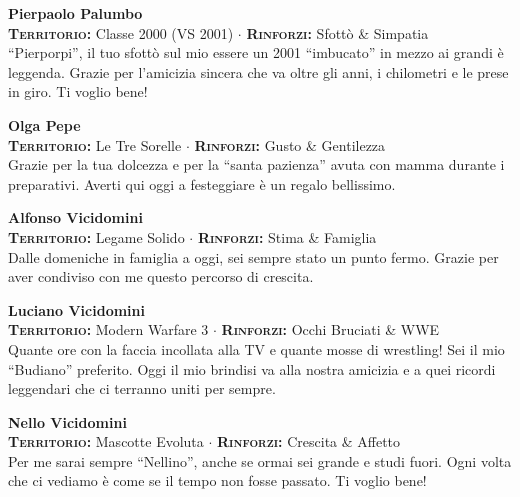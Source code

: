 \noindent\begin{minipage}{\linewidth}
\textbf{Pierpaolo Palumbo} \\
{\footnotesize \textbf{\textsc{Territorio:}} Classe 2000 (VS 2001) $\cdot$ \textbf{\textsc{Rinforzi:}} Sfottò \& Simpatia} \\
``Pierporpi'', il tuo sfottò sul mio essere un 2001 ``imbucato'' in mezzo ai grandi è leggenda. Grazie per l'amicizia sincera che va oltre gli anni, i chilometri e le prese in giro. Ti voglio bene!
\end{minipage}
\vspace{0.6cm}

\noindent\begin{minipage}{\linewidth}
\textbf{Olga Pepe} \\
{\footnotesize \textbf{\textsc{Territorio:}} Le Tre Sorelle $\cdot$ \textbf{\textsc{Rinforzi:}} Gusto \& Gentilezza} \\
Grazie per la tua dolcezza e per la ``santa pazienza'' avuta con mamma durante i preparativi. Averti qui oggi a festeggiare è un regalo bellissimo.
\end{minipage}
\vspace{0.6cm}

\noindent\begin{minipage}{\linewidth}
\textbf{Alfonso Vicidomini} \\
{\footnotesize \textbf{\textsc{Territorio:}} Legame Solido $\cdot$ \textbf{\textsc{Rinforzi:}} Stima \& Famiglia} \\
Dalle domeniche in famiglia a oggi, sei sempre stato un punto fermo. Grazie per aver condiviso con me questo percorso di crescita.
\end{minipage}
\vspace{0.6cm}

\noindent\begin{minipage}{\linewidth}
\textbf{Luciano Vicidomini} \\
{\footnotesize \textbf{\textsc{Territorio:}} Modern Warfare 3 $\cdot$ \textbf{\textsc{Rinforzi:}} Occhi Bruciati \& WWE} \\
Quante ore con la faccia incollata alla TV e quante mosse di wrestling! Sei il mio ``Budiano'' preferito. Oggi il mio brindisi va alla nostra amicizia e a quei ricordi leggendari che ci terranno uniti per sempre.
\end{minipage}
\vspace{0.6cm}

\noindent\begin{minipage}{\linewidth}
\textbf{Nello Vicidomini} \\
{\footnotesize \textbf{\textsc{Territorio:}} Mascotte Evoluta $\cdot$ \textbf{\textsc{Rinforzi:}} Crescita \& Affetto} \\
Per me sarai sempre ``Nellino'', anche se ormai sei grande e studi fuori. Ogni volta che ci vediamo è come se il tempo non fosse passato. Ti voglio bene!
\end{minipage}

